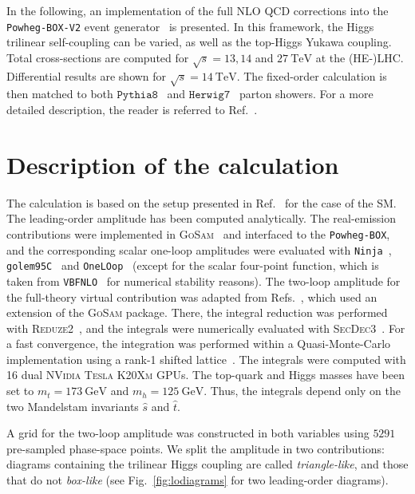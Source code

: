 \documentclass[a4paper]{jpconf}
\newcommand{\GeV}{\ensuremath{\mathrm{\:GeV}}}
\newcommand{\TeV}{\ensuremath{\mathrm{\:TeV}}}
\newcommand{\pythia}{\texttt{Pythia8}}
\newcommand{\herwig}{\texttt{Herwig7}}
\begin{document}
In the following, an implementation of the full NLO QCD corrections into the \texttt{Powheg-BOX-V2} event generator~\cite{Nason:2004rx,Frixione:2007vw,Alioli:2010xd} is presented. In this framework, the Higgs trilinear self-coupling can be varied, as well as the top-Higgs Yukawa coupling. Total cross-sections are computed for $\sqrt{s}=13,14$ and $27 \TeV$ at the (HE-)LHC. Differential results are shown for $\sqrt{s}=14 \TeV$. The fixed-order calculation is then matched to both $\pythia$~\cite{Sjostrand:2014zea} and $\herwig$~\cite{Bellm:2017bvx} parton showers. For a more detailed description, the reader is referred to Ref.~\cite{Heinrich:2019bkc}.

\section{Description of the calculation}

The calculation is based on the setup presented in Ref.~\cite{Heinrich:2017kxx} for the case of the SM. The leading-order amplitude has been computed analytically. The real-emission contributions were implemented in \textsc{GoSam}~\cite{Cullen:2011ac,Cullen:2014yla} and interfaced to the \texttt{Powheg-BOX}, and the corresponding scalar one-loop amplitudes were evaluated with \texttt{Ninja}~\cite{Peraro:2014cba}, \texttt{golem95C}~\cite{Binoth:2008uq,Cullen:2011kv} and \texttt{OneLOop}~\cite{vanHameren:2010cp} (except for the scalar four-point function, which is taken from \texttt{VBFNLO}~\cite{Arnold:2008rz,Baglio:2014uba} for numerical stability reasons).
The two-loop amplitude for the full-theory virtual contribution was adapted from Refs.~\cite{Borowka:2016ehy,Borowka:2016ypz}, which used an extension of the \textsc{GoSam} package. There, the integral reduction was performed with \textsc{Reduze2}~\cite{vonManteuffel:2012np}, and the integrals were numerically evaluated with \textsc{SecDec3}~\cite{Borowka:2015mxa}. For a fast convergence, the integration was performed within a Quasi-Monte-Carlo implementation using a rank-1 shifted lattice~\cite{Borowka:2018goh,Jones:2016bci}. The integrals were computed with 16 dual \textsc{NVidia Tesla K20Xm} GPUs. The top-quark and Higgs masses have been set to $m_t=173 \GeV$ and $m_h = 125 \GeV$. Thus, the integrals depend only on the two Mandelstam invariants $\hat{s}$ and $\hat{t}$.

A grid for the two-loop amplitude was constructed in both variables using $5291$ pre-sampled phase-space points. %
We split the amplitude in two contributions: diagrams containing the trilinear Higgs coupling are called \textit{triangle-like}, and those that do not \textit{box-like} (see Fig.~\ref{fig:lodiagrams} for two leading-order diagrams). 
\end{document}
